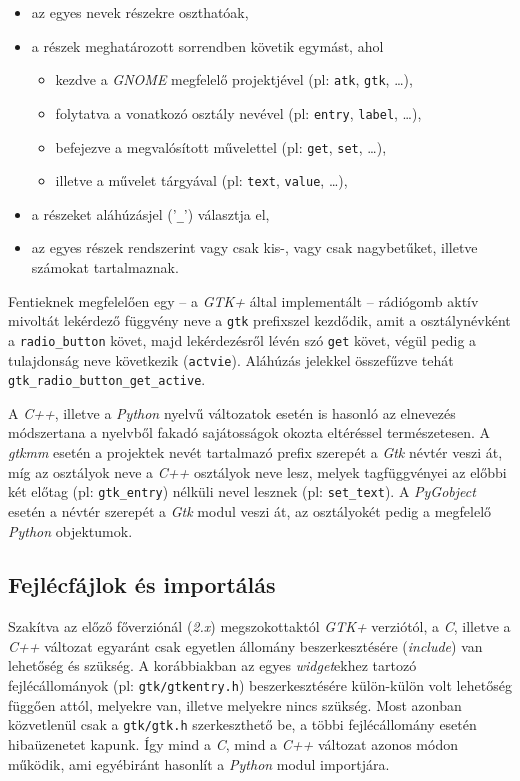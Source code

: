 \begin{itemize}
  \item az egyes nevek részekre oszthatóak,
  \item a részek meghatározott sorrendben követik egymást, ahol
  \begin{itemize}
    \item kezdve a \textit{GNOME} megfelelő projektjével (pl: \texttt{atk}, \texttt{gtk}, \dots),
    \item folytatva a vonatkozó osztály nevével (pl: \texttt{entry}, \texttt{label}, \dots),
    \item befejezve a megvalósított művelettel (pl: \texttt{get}, \texttt{set}, \dots),
    \item illetve a művelet tárgyával (pl: \texttt{text}, \texttt{value}, \dots),
  \end{itemize}
  \item a részeket aláhúzásjel ('\texttt{\_}') választja el,
  \item az egyes részek rendszerint vagy csak kis-, vagy csak nagybetűket, illetve számokat tartalmaznak.
\end{itemize}

Fentieknek megfelelően egy -- a \textit{GTK+} által implementált -- rádiógomb aktív mivoltát lekérdező függvény neve a \texttt{gtk} prefixszel kezdődik, amit a osztálynévként a \texttt{radio\_button} követ, majd lekérdezésről lévén szó \texttt{get} követ, végül pedig a tulajdonság neve következik (\texttt{actvie}). Aláhúzás jelekkel összefűzve tehát \texttt{gtk\_radio\_button\_get\_active}.

A \textit{C++}, illetve a \textit{Python} nyelvű változatok esetén is hasonló az elnevezés módszertana a nyelvből fakadó sajátosságok okozta eltéréssel természetesen. A \textit{gtkmm} esetén a projektek nevét tartalmazó prefix szerepét a \textit{Gtk} névtér veszi át, míg az osztályok neve a \textit{C++} osztályok neve lesz, melyek tagfüggvényei az előbbi két előtag (pl: \texttt{gtk\_entry}) nélküli nevel lesznek (pl: \texttt{set\_text}). A \textit{PyGobject} esetén a névtér szerepét a \textit{Gtk} modul veszi át, az osztályokét pedig a megfelelő \textit{Python} objektumok.

\subsection{Fejlécfájlok és importálás}

Szakítva az előző főverziónál (\textit{2.x}) megszokottaktól \textit{GTK+} verziótól, a \textit{C}, illetve a \textit{C++} változat egyaránt csak egyetlen állomány beszerkesztésére (\textit{include}) van lehetőség és szükség. A korábbiakban az egyes \textit{widget}ekhez tartozó fejlécállományok (pl: \texttt{gtk/gtkentry.h}) beszerkesztésére külön-külön volt lehetőség függően attól, melyekre van, illetve melyekre nincs szükség. Most azonban közvetlenül csak a \texttt{gtk/gtk.h} szerkeszthető be, a többi fejlécállomány esetén hibaüzenetet kapunk. Így mind a \textit{C}, mind a \textit{C++} változat azonos módon működik, ami egyébiránt hasonlít a \textit{Python} modul importjára.

